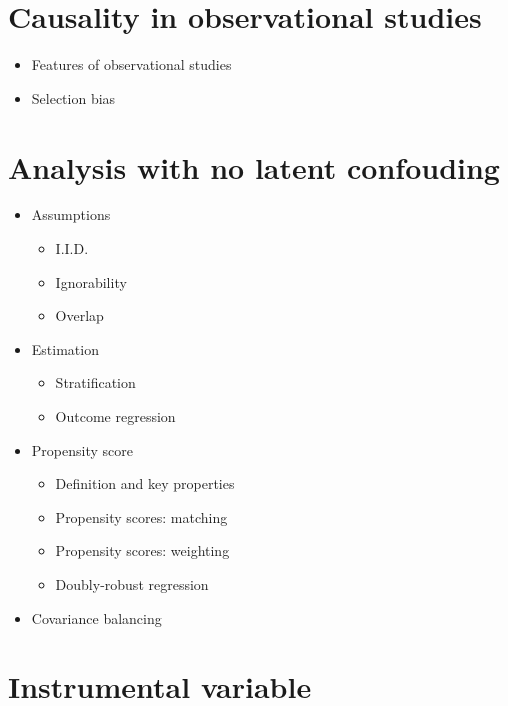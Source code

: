 \documentclass[12pt,]{book}
\providecommand{\tightlist}{%
  \setlength{\itemsep}{0pt}\setlength{\parskip}{0pt}}
\begin{document}
\section{Causality in observational
studies}\label{causality-in-observational-studies}

\begin{itemize}
\tightlist
\item
  Features of observational studies
\item
  Selection bias
\end{itemize}

\section{Analysis with no latent
confouding}\label{analysis-with-no-latent-confouding}

\begin{itemize}
\tightlist
\item
  Assumptions

  \begin{itemize}
  \tightlist
  \item
    I.I.D.
  \item
    Ignorability
  \item
    Overlap
  \end{itemize}
\item
  Estimation

  \begin{itemize}
  \tightlist
  \item
    Stratification
  \item
    Outcome regression
  \end{itemize}
\item
  Propensity score

  \begin{itemize}
  \tightlist
  \item
    Definition and key properties
  \item
    Propensity scores: matching
  \item
    Propensity scores: weighting
  \item
    Doubly-robust regression
  \end{itemize}
\item
  Covariance balancing
\end{itemize}

\section{Instrumental variable}\label{instrumental-variable}
\end{document}
